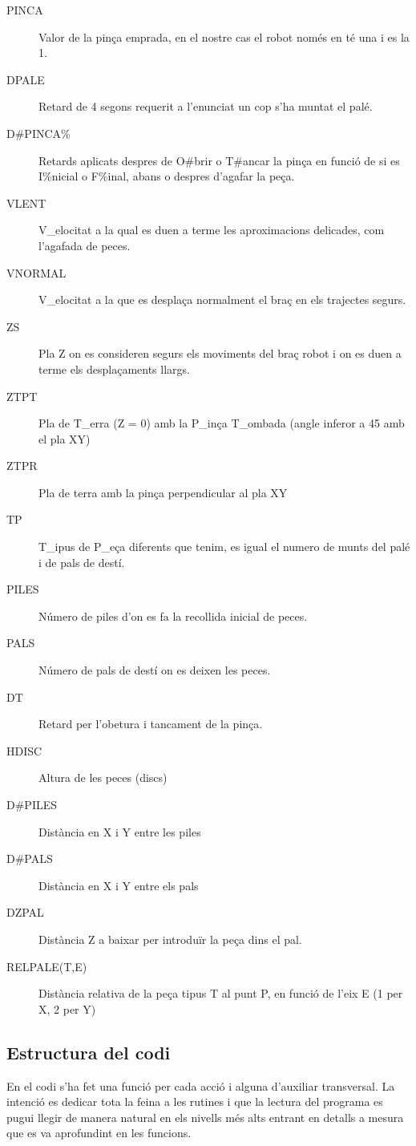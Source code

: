 \begin{description}\label{macprop}
\item [PINCA] Valor de la pinça emprada, en el nostre cas el robot només en té
una i es la 1.
\item [DPALE] Retard de 4 segons requerit a l'enunciat un cop s'ha muntat el
palé.
\item [D\#PINCA\%] Retards aplicats despres de O\#brir o T\#ancar la pinça en
funció de si es I\%nicial o F\%inal,
abans o despres d'agafar la peça.
\item [VLENT] V\_elocitat a la qual es duen a terme les aproximacions
delicades, com l'agafada de peces.
\item [VNORMAL] V\_elocitat a la que es desplaça normalment el braç en els
trajectes segurs.
\item [ZS] Pla Z on es consideren segurs els moviments del braç robot i on
es duen a terme els desplaçaments llargs.
\item [ZTPT] Pla de T\_erra (Z = 0) amb la P\_inça T\_ombada (angle inferor
a 45 amb el pla XY)
\item [ZTPR] Pla de terra amb la pinça perpendicular al pla XY                                                                                                           
\item [TP] T\_ipus de P\_eça diferents que tenim, es igual el numero de munts
del palé i de pals de destí.
\item [PILES] Número de piles d'on es fa la recollida inicial de peces.
\item [PALS] Número de pals de destí on es deixen les peces.
\item [DT] Retard per l'obetura i tancament de la pinça.
\item [HDISC] Altura de les peces (discs)
\item [D\#PILES] Distància en X i Y entre les piles
\item [D\#PALS] Distància en X i Y entre els pals
\item [DZPAL] Distància Z a baixar per introduïr la peça dins el pal.
\item [RELPALE(T,E)] Distància relativa de la peça tipus T al punt P, en funció
de l'eix E (1 per X, 2 per Y)
\end{description}

\subsection{Estructura del codi}
En el codi s'ha fet una funció per cada acció i alguna d'auxiliar transversal.
La intenció es dedicar tota la feina a les rutines i que la lectura del
programa es pugui llegir de manera natural en els nivells més alts entrant en
detalls a mesura que es va aprofundint en les funcions.


